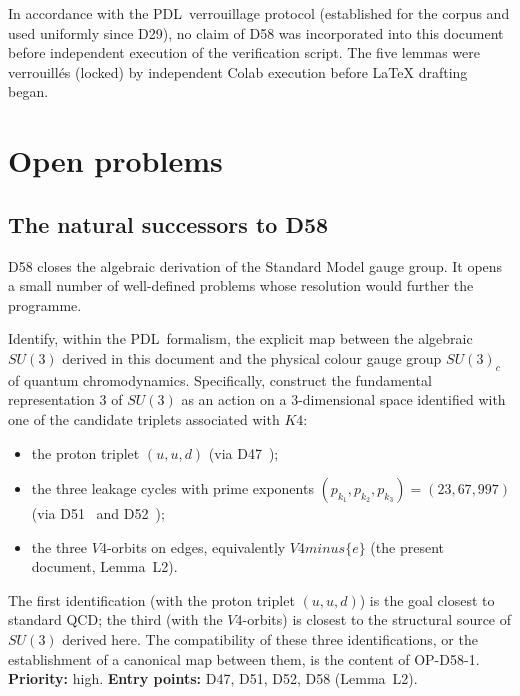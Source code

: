 \documentclass[11pt,a4paper]{article}
\def\Vfour{V4}%
\def\SUthree{SU(3)}%
\def\Kfour{K4}%
\def\PDL{PDL}%
\def\setminus{ minus }%
\def\mathrm#1{#1}%
\def\mathbf#1{#1}%
\def\textsc#1{#1}%
\theoremstyle{plain}
\theoremstyle{definition}
\theoremstyle{remark}
\newenvironment{openproblem}[1][]{%
  \begin{tcolorbox}[openproblemstyle,title={Open Problem\ifx\relax#1\relax\else: #1\fi}]}{\end{tcolorbox}}
\newcommand{\PDL}{\textsc{PDL}}
\newcommand{\Kfour}{K_4}
\newcommand{\Vfour}{V_4}
\newcommand{\SUthree}{\mathrm{SU}(3)}
\begin{document}
In accordance with the \PDL\ verrouillage protocol (established for the corpus and used uniformly since D29), no claim of D58 was incorporated into this document before independent execution of the verification script. The five lemmas were verrouillés (locked) by independent Colab execution before LaTeX drafting began.

\section{Open problems}
\label{sec:openproblems}

\subsection{The natural successors to D58}

D58 closes the algebraic derivation of the Standard Model gauge group. It opens a small number of well-defined problems whose resolution would further the programme.

\begin{openproblem}[OP-D58-1 --- Physical identification of $\SUthree$ with $\SUthree_{\mathrm{c}}$]
\label{op:D58-1}
Identify, within the \PDL\ formalism, the explicit map between the algebraic $\SUthree$ derived in this document and the physical colour gauge group $\SUthree_{\mathrm{c}}$ of quantum chromodynamics. Specifically, construct the fundamental representation $\mathbf{3}$ of $\SUthree$ as an action on a 3-dimensional space identified with one of the candidate triplets associated with $\Kfour$:
\begin{itemize}[leftmargin=2em]
\item the proton triplet $(u,u,d)$ (via D47~\cite{PDL_D47});
\item the three leakage cycles with prime exponents $(p_{k_1}, p_{k_2}, p_{k_3}) = (23, 67, 997)$ (via D51~\cite{PDL_D51} and D52~\cite{PDL_D52});
\item the three $\Vfour$-orbits on edges, equivalently $\Vfour \setminus \{e\}$ (the present document, Lemma~L2).
\end{itemize}
The first identification (with the proton triplet $(u,u,d)$) is the goal closest to standard QCD; the third (with the $\Vfour$-orbits) is closest to the structural source of $\SUthree$ derived here. The compatibility of these three identifications, or the establishment of a canonical map between them, is the content of OP-D58-1. \textbf{Priority:} high. \textbf{Entry points:} D47, D51, D52, D58 (Lemma~L2).
\end{openproblem}
\end{document}
